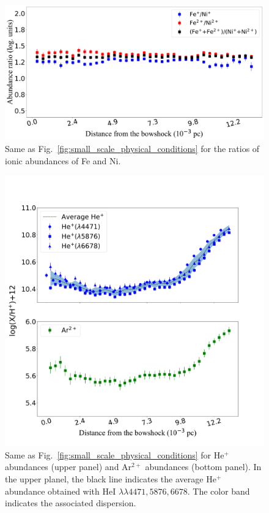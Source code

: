 \documentclass[twocolumn]{aastex63}
\begin{document}
\begin{figure}
\centering
\includegraphics[width=\columnwidth]{Ni_Fe_ionic_ratios_distribution.pdf}
\caption{Same as Fig.~\ref{fig:small_scale_physical_conditions} for the ratios of ionic abundances of Fe and Ni.}
\label{fig:Fe_Ni_abundance_ratios}
\end{figure}


\begin{figure}
\centering
\includegraphics[width=\columnwidth]{He_Ar_abundances.pdf}
\caption{Same as Fig.~\ref{fig:small_scale_physical_conditions} for He$^{+}$ abundances (upper panel) and Ar$^{2+}$ abundances (bottom panel). In the upper planel, the black line indicates the average He$^{+}$ abundance obtained with He\thinspace I $\lambda \lambda 4471,5876,6678$. The color band indicates the associated dispersion.}
\label{fig:he_Ar_abundances}
\end{figure}
\end{document}
